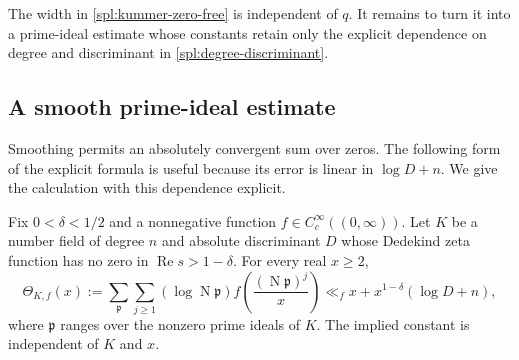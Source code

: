 The width in \eqref{spl:kummer-zero-free} is independent of $q$.
It remains to turn it into a prime-ideal estimate whose constants retain
only the explicit dependence on degree and discriminant in
\eqref{spl:degree-discriminant}.

\subsection{A smooth prime-ideal estimate}

Smoothing permits an absolutely convergent sum over zeros. The following
form of the explicit formula is useful because its error is linear in
$\log D+n$. We give the calculation with this dependence explicit.

\begin{lemma}\label{spl:smooth-estimate}
Fix $0<\delta<1/2$ and a nonnegative function
$f\in C_c^\infty((0,\infty))$. Let $K$ be a number field of degree $n$
and absolute discriminant $D$ whose Dedekind zeta function has no zero
in $\operatorname{Re}s>1-\delta$. For every real $x\ge2$,
\begin{equation}
 \Theta_{K,f}(x)
 :=\sum_{\mathfrak p}\sum_{j\ge1}
       (\log\operatorname{N}\mathfrak p)
       f\left(\frac{(\operatorname{N}\mathfrak p)^j}{x}\right)
 \ll_f x+x^{1-\delta}(\log D+n),
 \label{spl:smooth-prime-ideal-bound}
\end{equation}
where $\mathfrak p$ ranges over the nonzero prime ideals of $K$.
The implied constant is independent of $K$ and $x$.
\end{lemma}

